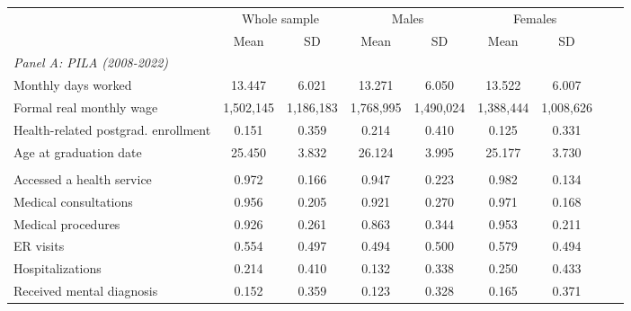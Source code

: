 \begin{tabular}{lcccccc}
\toprule
& \multicolumn{2}{c}{Whole sample} & \multicolumn{2}{c}{Males}     & \multicolumn{2}{c}{Females} \\
\cmidrule(l){2-3} \cmidrule(l){4-5} \cmidrule(l){6-7}
& Mean & SD & Mean & SD & Mean & SD \\
\midrule
\multicolumn{9}{l}{\textit{Panel A: PILA (2008-2022)}} \\
Monthly days worked & 13.447 & 6.021 & 13.271 & 6.050 & 13.522 & 6.007 \\ 
Formal real monthly wage & 1,502,145 & 1,186,183 & 1,768,995 & 1,490,024 & 1,388,444 & 1,008,626 \\ 
Health-related postgrad. enrollment & 0.151 & 0.359 & 0.214 & 0.410 & 0.125 & 0.331 \\ 
Age at graduation date & 25.450 & 3.832 & 26.124 & 3.995 & 25.177 & 3.730 \\ \addlinespace
\multicolumn{9}{l}{\textit{Panel B: RIPS (2009-2022)}} \\
Accessed a health service & 0.972 & 0.166 & 0.947 & 0.223 & 0.982 & 0.134 \\ 
Medical consultations & 0.956 & 0.205 & 0.921 & 0.270 & 0.971 & 0.168 \\ 
Medical procedures & 0.926 & 0.261 & 0.863 & 0.344 & 0.953 & 0.211 \\ 
ER visits & 0.554 & 0.497 & 0.494 & 0.500 & 0.579 & 0.494 \\ 
Hospitalizations & 0.214 & 0.410 & 0.132 & 0.338 & 0.250 & 0.433 \\ 
Received mental diagnosis & 0.152 & 0.359 & 0.123 & 0.328 & 0.165 & 0.371 \\ 
\bottomrule
\end{tabular}
